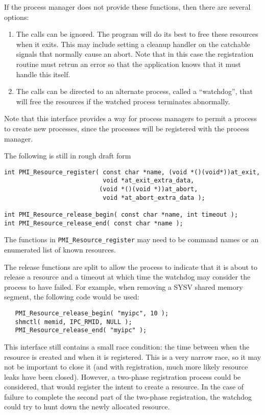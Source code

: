 \documentclass[11pt]{article}
\begin{document}
If the process manager does not provide these functions, then there
are several options:
\begin{enumerate}
\item The calls can be ignored.  The program will do its best to free
  these resources when it exits.  This may include setting a cleanup
  handler on the catchable signals that normally cause an abort.
  Note that in this case the registration routine must retrun an error
  so that the application knows that it must handle this itself.
\item The calls can be directed to an alternate process, called a
  ``watchdog'', that will free the resources if the watched process
  terminates abnormally.
\end{enumerate}

Note that this interface provides a way for process managers to permit
a process to create new processes, since the processes will be
registered with the process manager.

The following is still in rough draft form
\begin{verbatim}
int PMI_Resource_register( const char *name, (void *()(void*))at_exit, 
                           void *at_exit_extra_data,
                          (void *()(void *))at_abort, 
                           void *at_abort_extra_data );

int PMI_Resource_release_begin( const char *name, int timeout );
int PMI_Resource_release_end( const char *name );
\end{verbatim}

The functions in \texttt{PMI\_Resource\_register} may need to be
command names or an enumerated list of known resources.  

The release functions are split to allow the process to indicate that
it is about to release a resource and a timeout at which time the
watchdog may consider the process to have failed.  For example, when
removing a SYSV shared memory segment, the following code would be used:

\begin{verbatim}
   PMI_Resource_release_begin( "myipc", 10 );
   shmctl( memid, IPC_RMID, NULL );
   PMI_Resource_release_end( "myipc" );
\end{verbatim}

This interface still contains a small race condition: the time between
when the resource is created and when it is registered.  This is a
very narrow race, so it may not be important to close it (and with
registration, much more likely resource leaks have been closed).
However, a two-phase registration process could be considered, that
would register the intent to create a resource.  In the case of
failure to complete the second part of the two-phase registration, the
watchdog could try to hunt down the newly allocated resource.  
\end{document}
